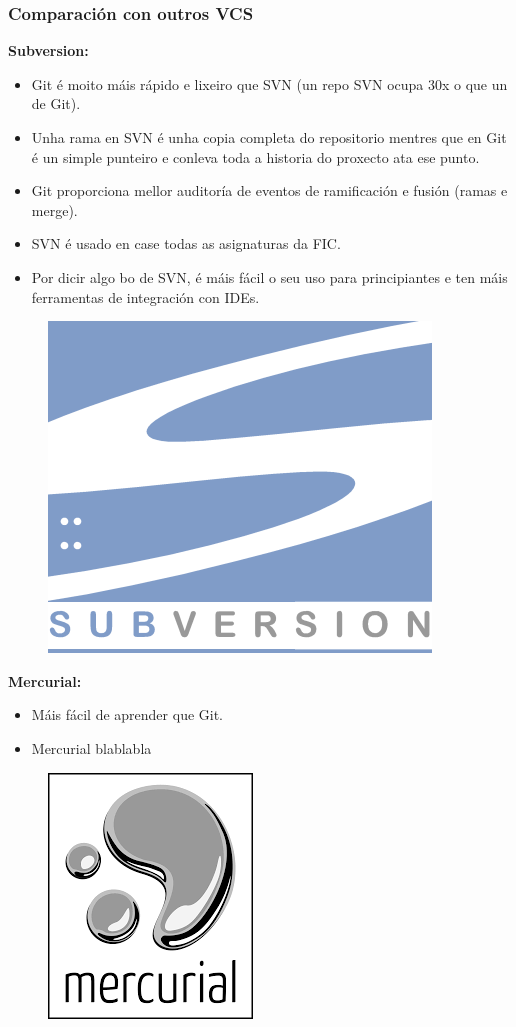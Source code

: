 \begin{frame}
	\frametitle{Comparación con outros VCS}
	\tiny
	\begin{multicols}{2}
		 \textbf{Subversion:}
		 \begin{itemize}
		 	\item Git é moito máis rápido e lixeiro que SVN (un repo SVN ocupa 30x o que un de Git).
			\item Unha rama en SVN é unha copia completa do repositorio mentres que en Git é un simple punteiro e conleva toda a historia do proxecto ata ese punto.
			\item Git proporciona mellor auditoría de eventos de ramificación e fusión (ramas e merge).
			\item SVN é usado en case todas as asignaturas da FIC.
			\item Por dicir algo bo de SVN, é máis fácil o seu uso para principiantes e ten máis ferramentas de integración con IDEs.
		 \end{itemize}
		\begin{figure}
			\centering
			\includegraphics[width=0.3\linewidth]{./img/svn}
			\label{fig:svn}
		\end{figure}

		\columnbreak

		 \textbf{Mercurial:}
		 \begin{itemize}
		  \item Máis fácil de aprender que Git.
		  \item Mercurial blablabla
		 \end{itemize}
		\begin{figure}
		\centering
		\includegraphics[width=0.3\linewidth, height=0.2\textheight]{./img/mercurial}
		\label{fig:mercurial}
		\end{figure}
		\end{multicols}
\end{frame}

